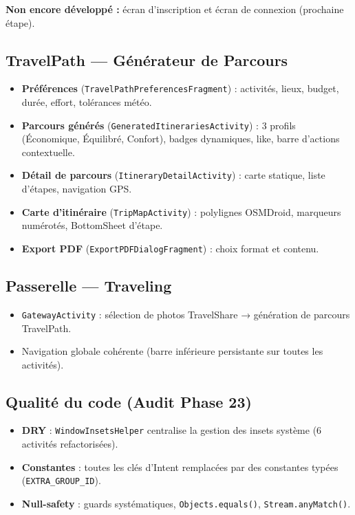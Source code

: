 \documentclass[a4paper,11pt]{article}
\begin{document}
\medskip
\noindent\textbf{Non encore développé :} écran d'inscription et écran de connexion (prochaine étape).

\subsection{TravelPath — Générateur de Parcours}
\begin{itemize}[leftmargin=1.5em, itemsep=2pt]
    \item \textbf{Préférences} (\texttt{TravelPathPreferencesFragment}) : activités, lieux, budget, durée, effort, tolérances météo.
    \item \textbf{Parcours générés} (\texttt{GeneratedItinerariesActivity}) : 3 profils (Économique, Équilibré, Confort), badges dynamiques, like, barre d'actions contextuelle.
    \item \textbf{Détail de parcours} (\texttt{ItineraryDetailActivity}) : carte statique, liste d'étapes, navigation GPS.
    \item \textbf{Carte d'itinéraire} (\texttt{TripMapActivity}) : polylignes OSMDroid, marqueurs numérotés, BottomSheet d'étape.
    \item \textbf{Export PDF} (\texttt{ExportPDFDialogFragment}) : choix format et contenu.
\end{itemize}

\subsection{Passerelle — Traveling}
\begin{itemize}[leftmargin=1.5em, itemsep=2pt]
    \item \texttt{GatewayActivity} : sélection de photos TravelShare → génération de parcours TravelPath.
    \item Navigation globale cohérente (barre inférieure persistante sur toutes les activités).
\end{itemize}

\subsection{Qualité du code (Audit Phase 23)}
\begin{itemize}[leftmargin=1.5em, itemsep=2pt]
    \item \textbf{DRY} : \texttt{WindowInsetsHelper} centralise la gestion des insets système (6 activités refactorisées).
    \item \textbf{Constantes} : toutes les clés d'Intent remplacées par des constantes typées (\texttt{EXTRA\_GROUP\_ID}).
    \item \textbf{Null-safety} : guards systématiques, \texttt{Objects.equals()}, \texttt{Stream.anyMatch()}.
\end{itemize}
\end{document}
